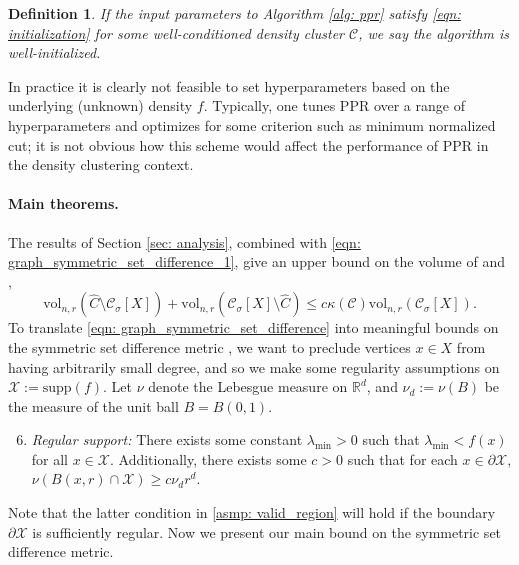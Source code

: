 \documentclass{article}
\newcommand{\vol}{\mathrm{vol}}
\newcommand{\Reals}{\mathbb{R}}
\newcommand{\Rd}{\Reals^d}
\newcommand{\1}{\mathbf{1}}
\newcommand{\Xbf}{X}             %
\newcommand{\Cset}{\mathcal{C}}
\newcommand{\Csig}{\Cset_{\sigma}}
\newcommand{\Cest}{\widehat{C}}
\theoremstyle{aldenthm}
\newtheorem{definition}{Definition}
\theoremstyle{aldenrmrk}
\begin{document}
\begin{definition}
If the input parameters to Algorithm \ref{alg: ppr} satisfy \eqref{eqn:
  initialization} for some well-conditioned density cluster $\Cset$, we
say the algorithm is \emph{well-initialized}. 
\end{definition}

In practice it is clearly not feasible to set hyperparameters based on the
underlying (unknown) density $f$. Typically, one tunes PPR over a range of
hyperparameters and optimizes for some criterion such as minimum normalized cut;
it is not obvious how this scheme would affect the performance of PPR in the
density clustering context.  

\paragraph{Main theorems.} The results of Section \ref{sec: analysis}, combined 
with \eqref{eqn: graph_symmetric_set_difference_1}, give an upper bound on the
volume of \smash{$\Cest \setminus \Csig[\Xbf]$} and \smash{$\Csig[\Xbf]
  \setminus \Cest$},  
\begin{equation}
\label{eqn: graph_symmetric_set_difference}
\vol_{n,r}(\Cest \setminus \Csig[\Xbf]) + \vol_{n,r}(\Csig[\Xbf] \setminus
\Cest) \leq c \kappa(\Cset) \vol_{n,r}(\Csig[\Xbf]). 
\end{equation}
To translate \eqref{eqn: graph_symmetric_set_difference} into meaningful bounds
on the symmetric set difference metric \smash{$\Delta(\Csig[\Xbf], \Cest)$}, we
want to preclude vertices $x \in \Xbf$ from having arbitrarily small degree, and
so we make some regularity assumptions on $\mathcal{X} := \mathrm{supp}(f)$. Let
$\nu$ denote the Lebesgue measure on $\Rd$, and $\nu_d := \nu(B)$ be the measure
of the unit ball $B = B(0,1)$. 
\begin{enumerate}[label=(A\arabic*)]
  \setcounter{enumi}{5}
\item 
  \label{asmp: valid_region}
  \emph{Regular support:} There exists some constant $\lambda_{\min} > 0$ such 
  that $\lambda_{\min} < f(x)$ for all $x \in \mathcal{X}$. Additionally, there
  exists some $c > 0$ such that for each $x \in \partial \mathcal{X}$,
  $\nu(B(x,r) \cap \mathcal{X}) \geq c \nu_d r^d$. 
\end{enumerate}
Note that the latter condition in \ref{asmp: valid_region} will hold if the
boundary $\partial \mathcal{X}$ is sufficiently regular.  Now we present our
main bound on the symmetric set difference metric.
\end{document}
